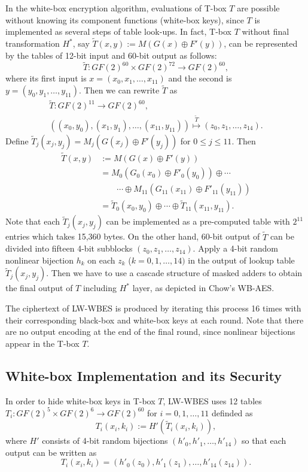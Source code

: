\documentclass{ieeeaccess}
\begin{document}
In the white-box encryption algorithm,
evaluations of T-box $T$ are possible without knowing its component functions (white-box keys),
since $T$ is implemented as several steps of table look-ups.
In fact, T-box $T$ without final transformation $H^*$, 
say $\tilde T(x,y):= M(G(x)\oplus F'(y))$, can be represented
by the tables of 12-bit input and 60-bit output as follows:
\[
\tilde T: GF(2)^{60} \times GF(2)^{72} \to GF(2)^{60}, 
\]
where its first input is $x = (x_0, x_1, \ldots, x_{11})$  
and the second is $y = (y_0, y_1, \ldots , y_{11})$.
Then we can rewrite $\tilde T$ as  
\begin{gather*}
\tilde T: GF(2)^{11} \to GF(2)^{60},\\
\left( (x_0, y_0), (x_1, y_1), \ldots, (x_{11}, y_{11}) \right)
\stackrel{\tilde T}{\mapsto} (z_0, z_1, \ldots, z_{14}).
\end{gather*}
Define $\tilde T_j(x_j, y_j) = M_j( G(x_j) \oplus F'(y_j))$ for
$0\le j \le 11$.
Then 
\begin{align*}
\tilde T(x,y) & := M(G(x)\oplus F'(y)) \\
&= M_0(G_0(x_0)\oplus F'_0(y_0)) \oplus \cdots \\
& \quad\quad \cdots\oplus M_{11}(G_{11}(x_{11}) \oplus F'_{11}(y_{11})) \\
&= \tilde T_0(x_0, y_0) \oplus \cdots \oplus \tilde T_{11}(x_{11}, y_{11}).
\end{align*}
Note that each $\tilde T_j(x_j, y_j)$ can be implemented
as a pre-computed table with $2^{11}$ entries which takes 15,360 bytes.
On the other hand, 60-bit output of $\tilde T$ can be divided into 
fifteen 4-bit subblocks $(z_0, z_1, \ldots, z_{14})$.
Apply a 4-bit random nonlinear bijection $h_k$ on each $z_k$ ($k=0,1,\ldots, 14)$
in the output of lookup table $\tilde T_j(x_j, y_j)$. Then
we have to use a cascade structure of masked adders 
to obtain the final output of $T$ including $H^*$ layer, 
as depicted in Chow's WB-AES.

The ciphertext of LW-WBES is produced by iterating this process 16 times
with their corresponding black-box and white-box keys at each round.
Note that there are no output encoding at the end of the final round,
since nonlinear bijections appear in the T-box $T$.

\subsection{White-box Implementation and its Security}

In order to hide white-box keys in T-box $T$,
LW-WBES uses 12 tables $T_i: GF(2)^5 \times GF(2)^6 \to GF(2)^{60}$
for $i=0,1,\ldots, 11$ definded as
\[
T_i(x_i, k_i) := H'(\tilde T_i(x_i, k_i)),
\]
where $H'$ consists of 4-bit random bijections
$(h'_0, h'_1, \ldots, h'_{14})$ so that
each output can be written as
\[
T_i(x_i, k_i) = (h'_0(z_0), h'_1(z_1), \ldots, h'_{14}(z_{14})).
\]
\end{document}
